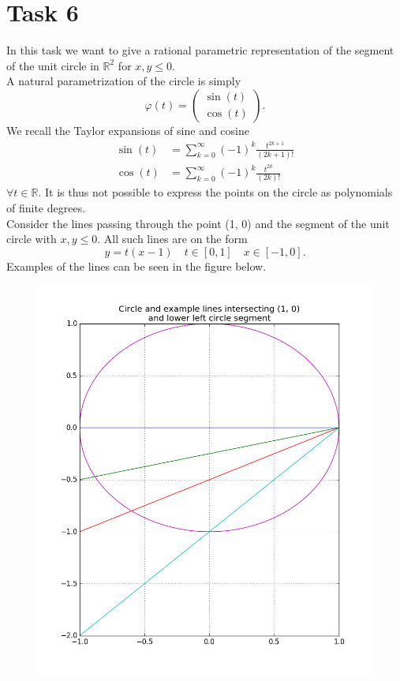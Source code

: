 \documentclass[]{article}
\begin{document}
\newpage
\section*{Task 6}
In this task we want to give a rational parametric representation of the segment of the unit circle in $\mathbb{R}^2$ for $x, y \leq 0$.\\
A natural parametrization of the circle is simply\begin{equation*}
\varphi(t) = \left(\begin{array}{c}
\sin(t)\\
\cos(t)
\end{array}\right).
\end{equation*}
We recall the Taylor expansions of sine and cosine\begin{equation}
\begin{aligned}
\sin(t) &= \sum_{k=0}^{\infty}(-1)^k\frac{t^{2k+1}}{(2k+1)!}\\
\cos(t) &= \sum_{k=0}^{\infty}(-1)^k\frac{t^{2k}}{(2k)!}
\end{aligned}
\end{equation}
$\forall t\in\mathbb{R}$. It is thus not possible to express the points on the circle as polynomials of finite degrees.\\
Consider the lines passing through the point (1, 0) and the segment of the unit circle with $x, y\leq 0$. All such lines are on the form \begin{equation}\label{lines}
y=t(x-1)\quad t\in[0, 1]\quad x\in[-1, 0].
\end{equation}
Examples of the lines can be seen in the figure below.
\begin{figure}[h!]
	\includegraphics[scale=0.6]{circlelines}
\end{figure}
\end{document}
